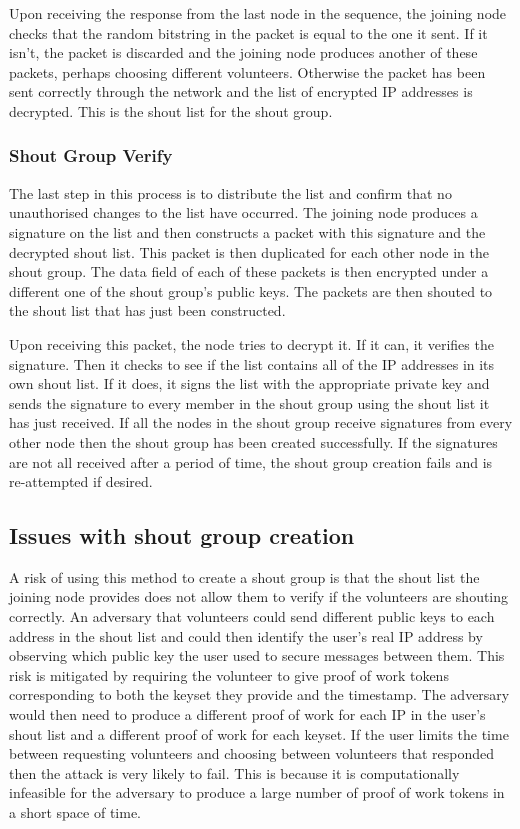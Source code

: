 \documentclass[ %
                    author={Luke Murray},
                supervisor={Dr. Simon Hollis},
                     title={Shadow Peer-to-Peer Networks},
                  subtitle={},
                    degree={MEng},
                      year={2013} ]{thesis}
\begin{document}
Upon receiving the response from the last node in the sequence, the joining node checks that the random bitstring in the packet is equal to the one it sent. If it isn't, the packet is discarded and the joining node produces another of these packets, perhaps choosing different volunteers. Otherwise the packet has been sent correctly through the network and the list of encrypted IP addresses is decrypted. This is the shout list for the shout group.

\subsubsection{Shout Group Verify}

The last step in this process is to distribute the list and confirm that no unauthorised changes to the list have occurred. The joining node produces a signature on the list and then constructs a packet with this signature and the decrypted shout list. This packet is then duplicated for each other node in the shout group. The data field of each of these packets is then encrypted under a different one of the shout group's public keys. The packets are then shouted to the shout list that has just been constructed.

Upon receiving this packet, the node tries to decrypt it. If it can, it verifies the signature. Then it checks to see if the list contains all of the IP addresses in its own shout list. If it does, it signs the list with the appropriate private key and sends the signature to every member in the shout group using the shout list it has just received. If all the nodes in the shout group receive signatures from every other node then the shout group has been created successfully. If the signatures are not all received after a period of time, the shout group creation fails and is re-attempted if desired.

\subsection{Issues with shout group creation}

A risk of using this method to create a shout group is that the shout list the joining node provides does not allow them to verify if the volunteers are shouting correctly. An adversary that volunteers could send different public keys to each address in the shout list and could then identify the user's real IP address by observing which public key the user used to secure messages between them. This risk is mitigated by requiring the volunteer to give proof of work tokens corresponding to both the keyset they provide and the timestamp. The adversary would then need to produce a different proof of work for each IP in the user's shout list and a different proof of work for each keyset. If the user limits the time between requesting volunteers and choosing between volunteers that responded then the attack is very likely to fail. This is because it is computationally infeasible for the adversary to produce a large number of proof of work tokens in a short space of time.
\end{document}
